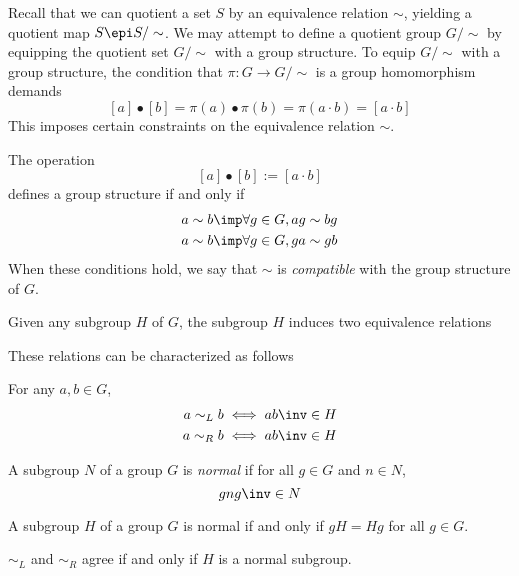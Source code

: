 \documentclass{amsart}
\begin{document}
Recall that we can quotient a set $S$ by an equivalence relation $\sim$, yielding a quotient map $S \epi S/\sim$.
We may attempt to define a quotient group $G/\sim$ by equipping the quotient set $G/\sim$ with a group structure.
To equip $G/\sim$ with a group structure, the condition that $\pi : G \to G/\sim$ is a group homomorphism demands
\[
  [a] \bullet [b] = \pi(a) \bullet \pi(b) = \pi(a \cdot b) = [a \cdot b]
\]
This imposes certain constraints on the equivalence relation $\sim$.

\begin{lem}
  The operation
  \[
    [a] \bullet [b] := [a \cdot b]
  \]
  defines a group structure if and only if
  \begin{align}
    a \sim b &\imp \forall g \in G, ag \sim bg\\
    a \sim b &\imp \forall g \in G, ga \sim gb
  \end{align}
  When these conditions hold, we say that $\sim$ is \emph{compatible} with the group structure of $G$.
\end{lem}

Given any subgroup $H$ of $G$, the subgroup $H$ induces two equivalence relations

These relations can be characterized as follows
\begin{lem}
  For any $a, b \in G$,
  \begin{align}
    a \sim_{L} b &\iff ab\inv \in H\\
    a \sim_{R} b &\iff ab\inv \in H\\
  \end{align}
\end{lem}

\begin{defn}
  A subgroup $N$ of a group $G$ is \emph{normal} if for all $g \in G$ and $n \in N$,
  \[
    gng\inv \in N
  \]
\end{defn}

\begin{lem}
  A subgroup $H$ of a group $G$ is normal if and only if $gH = Hg$ for all $g \in G$.
\end{lem}

\begin{cor}
  $\sim_{L}$ and $\sim_{R}$ agree if and only if $H$ is a normal subgroup.
\end{cor}
\end{document}

